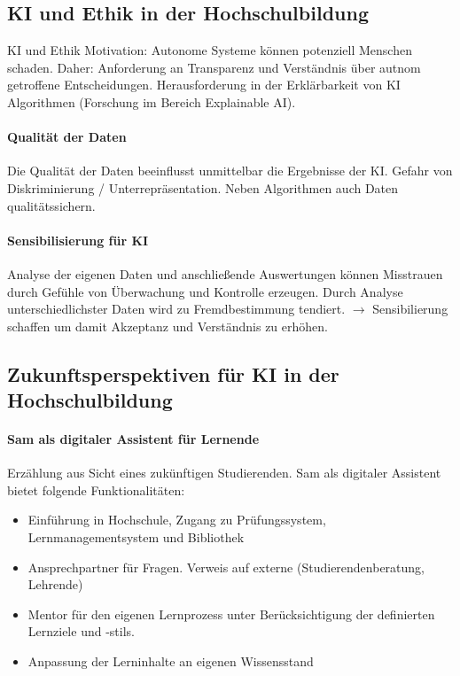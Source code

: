 \subsection{KI und Ethik in der Hochschulbildung}
KI und Ethik Motivation: Autonome Systeme können potenziell Menschen schaden. Daher: Anforderung an Transparenz und Verständnis über autnom getroffene Entscheidungen. Herausforderung in der Erklärbarkeit von KI Algorithmen (Forschung im Bereich \glqq Explainable AI\grqq{}).

\paragraph*{Qualität der Daten} Die Qualität der Daten beeinflusst unmittelbar die Ergebnisse der KI. Gefahr von Diskriminierung / Unterrepräsentation. Neben Algorithmen auch Daten qualitätssichern.

\paragraph*{Sensibilisierung für KI} Analyse der eigenen Daten und anschließende Auswertungen können Misstrauen durch Gefühle von Überwachung und Kontrolle erzeugen. Durch Analyse unterschiedlichster Daten wird zu Fremdbestimmung tendiert. $\rightarrow$ Sensibilierung schaffen um damit Akzeptanz und Verständnis zu erhöhen.

\subsection{Zukunftsperspektiven für KI in der Hochschulbildung}

\paragraph*{Sam als digitaler Assistent für Lernende}
Erzählung aus Sicht eines zukünftigen Studierenden. Sam als digitaler Assistent bietet folgende Funktionalitäten:
\begin{itemize}
    \item Einführung in Hochschule, Zugang zu Prüfungssystem, Lernmanagementsystem und Bibliothek
    \item Ansprechpartner für Fragen. Verweis auf externe (Studierendenberatung, Lehrende)
    \item Mentor für den eigenen Lernprozess unter Berücksichtigung der definierten Lernziele und -stils.
    \item Anpassung der Lerninhalte an eigenen Wissensstand
\end{itemize}

